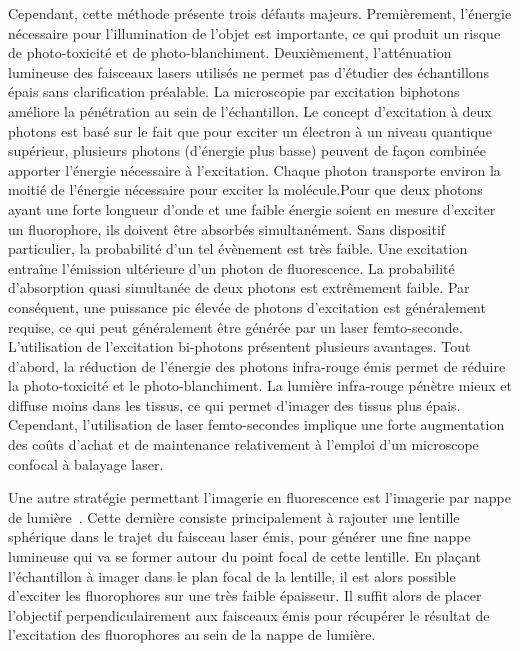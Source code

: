 \documentclass[\main/main.tex]{subfiles}
\begin{document}
%
Cependant, cette méthode présente trois défauts majeurs.
%
Premièrement, l'énergie nécessaire pour l'illumination de l'objet est importante, ce qui produit un risque de photo-toxicité et de photo\hyp{}blanchiment. Deuxièmement, l'atténuation lumineuse des faisceaux lasers utilisés ne permet pas d'étudier des échantillons épais sans clarification préalable.
%
La microscopie par excitation biphotons améliore la pénétration au sein de l'échantillon.
%
Le concept d'excitation à deux photons est basé sur le fait que pour exciter un électron à un niveau quantique supérieur, plusieurs photons (d’énergie plus basse) peuvent de façon combinée apporter l’énergie nécessaire à l’excitation. Chaque photon transporte environ la moitié de l'énergie nécessaire pour exciter la molécule.Pour que deux photons ayant une forte longueur d'onde et une faible énergie soient en mesure d'exciter un fluorophore, ils doivent être absorbés simultanément. Sans dispositif particulier, la probabilité d'un tel évènement est très faible.  Une excitation entraîne l'émission ultérieure d'un photon de fluorescence. La probabilité d'absorption quasi simultanée de deux photons est extrêmement faible. Par conséquent, une puissance pic élevée de photons d'excitation est généralement requise, ce qui peut généralement être générée par un laser femto\hyp{}seconde.
%
L'utilisation de l'excitation bi-photons présentent plusieurs avantages. Tout d'abord, la réduction de l'énergie des photons infra-rouge émis permet de réduire la photo-toxicité et le photo-blanchiment.
%
La lumière infra-rouge pénètre mieux et diffuse moins dans les tissus, ce qui permet d'imager des tissus plus épais.
%
Cependant, l'utilisation de laser femto\hyp{}secondes implique une forte augmentation des coûts d'achat et de maintenance relativement à l'emploi d'un microscope confocal à balayage laser.

\label{sec:spim}
Une autre stratégie permettant l'imagerie en fluorescence est l'imagerie par nappe de lumière~\cite{huisken_2004}. Cette dernière consiste principalement à rajouter une lentille sphérique dans le trajet du faisceau laser émis, pour générer une fine nappe lumineuse qui va se former autour du point focal de cette lentille.
%
En plaçant l'échantillon à imager dans le plan focal de la lentille,
il est alors possible d'exciter les fluorophores sur une très faible épaisseur.
%
Il suffit alors de placer l'objectif perpendiculairement aux faisceaux émis pour récupérer le résultat de l'excitation des fluorophores au sein de la nappe de lumière.
\end{document}
